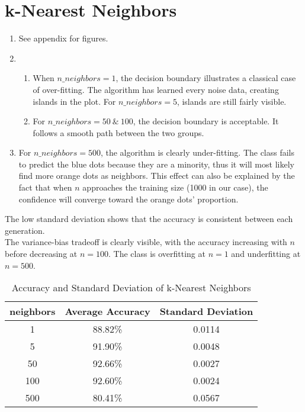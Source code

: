 \documentclass[acmconf,nonacm=true]{acmart}
\begin{document}
\section{k-Nearest Neighbors}

    \begin{enumerate}
    \item See appendix for figures.
    \item 
        \begin{enumerate}
            \item When $n\_neighbors = 1$, the decision boundary illustrates a classical case of over-fitting. The algorithm has learned every noise data, creating islands in the plot. For $n\_neighbors = 5$, islands are still fairly visible.
            \item For $n\_neighbors = 50\ \&\ 100$, the decision boundary is acceptable. It follows a smooth path between the two groups.
        \end{enumerate}
    \item For $n\_neighbors = 500$, the algorithm is clearly under-fitting. The class fails to predict the blue dots because they are a minority, thus it will most likely find more orange dots as neighbors. This effect can also be explained by the fact that when $n$ approaches the training size (1000 in our case), the confidence will converge toward the orange dots' proportion.
    \end{enumerate}
    
The low standard deviation shows that the accuracy is consistent between each generation.\\
The variance-bias tradeoff is clearly visible, with the accuracy increasing with $n$ before decreasing at $n=100$. The class is overfitting at $n=1$ and underfitting at $n=500$.

    \begin{table}[H]
    \centering
    \caption{Accuracy and Standard Deviation of k-Nearest Neighbors}
    \begin{tabular}{|c|c|c|}
    \hline
     neighbors & Average Accuracy & Standard Deviation \\
    \hline
    1 & 88.82\% & 0.0114 \\
    5 & 91.90\% & 0.0048 \\
    50 & 92.66\% & 0.0027 \\
    100 & 92.60\% & 0.0024 \\
    500 & 80.41\% & 0.0567 \\
    \hline
    \end{tabular}
    \end{table}
\end{document}
